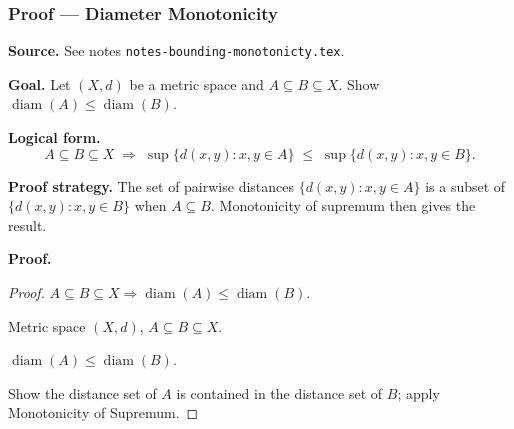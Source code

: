 
\clearpage
{}
\hypertarget{proof-RA-ABB-P-diameter-monotonicity}{}

\subsubsection[Diameter Monotonicity]{Proof --- Diameter Monotonicity}

\bigskip

\noindent
\textbf{Source.}
See notes \texttt{notes-bounding-monotonicty.tex}.

\vspace{0.75em}

\noindent
\textbf{Goal.}
Let $(X, d)$ be a metric space and $A \subseteq B \subseteq X$.
Show $\operatorname{diam}(A) \le \operatorname{diam}(B)$.

\vspace{0.75em}

\noindent
\textbf{Logical form.}
\[
  A \subseteq B \subseteq X
  \;\Rightarrow\;
  \sup\{d(x,y) : x,y \in A\}
  \;\le\;
  \sup\{d(x,y) : x,y \in B\}.
\]

\vspace{0.75em}

\noindent
\textbf{Proof strategy.}
The set of pairwise distances $\{d(x,y) : x,y \in A\}$ is a subset of
$\{d(x,y) : x,y \in B\}$ when $A \subseteq B$.
Monotonicity of supremum then gives the result.

\vspace{0.75em}

\noindent
\textbf{Proof.}
\begin{proof}
\Claim $A \subseteq B \subseteq X \Rightarrow \operatorname{diam}(A) \le \operatorname{diam}(B)$.

\Given Metric space $(X,d)$, $A \subseteq B \subseteq X$.

\Goal $\operatorname{diam}(A) \le \operatorname{diam}(B)$.

\Strategy Show the distance set of $A$ is contained in the distance set of $B$;
apply Monotonicity of Supremum.

\medskip



\end{proof}

